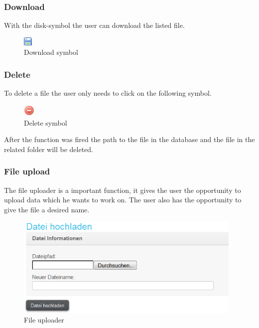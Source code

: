 \subsubsection{Download}

With the disk-symbol the user can download the listed file.

\begin{figure}[!h]
  \centering
    \includegraphics{images/disk.png}
  \caption{Download symbol}
  \label{fig: download symbol}
\end{figure}

\subsubsection{Delete}

To delete a file the user only needs to click on the following symbol.

\begin{figure}[!h]
  \centering
    \includegraphics[width=0.05\textwidth]{images/basic_functionalities/delete.png}
  \caption{Delete symbol}
  \label{fig: ddelete symbol}
\end{figure}

After the function was fired the path to the file in the database and the file in the related folder will be deleted.

\subsubsection{File upload}

The file uploader is a important function, it gives the user the opportunity to upload data which he wants to work on. The user also has the opportunity to give the file a desired name.


\begin{figure}[!ht]
  \centering
    \includegraphics[width=0.97\textwidth]{images/basic_functionalities/datei_hochladen.png}
  \caption{File uploader}
  \label{fig:file uploader}
\end{figure}


